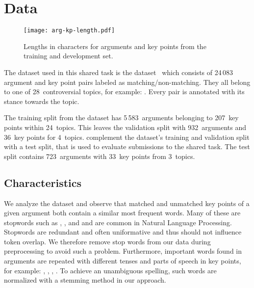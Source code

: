 \section{Data}\label{data}

\begin{figure*}
    \centering
    \texttt{[image: arg-kp-length.pdf]}
    \caption{Lengths in characters for arguments and key points from the training and development set.}
    \label{arg-kp-length}
\end{figure*}

The dataset used in this shared task is the \ArgKP dataset~\cite{Bar-HaimEFKLS2020} which consists of 24\,083 argument 
and key point pairs labeled as matching/non-matching. They all belong to one of 28~controversial topics, for example: 
. Every pair is annotated with its stance towards the topic. 

The training split from the \ArgKP dataset has 5\,583~arguments belonging to 207~key points within 24~topics. This leaves the validation split with 932~arguments and 36~key points for 4~topics.
\citet{kpa-2021-overview} complement the \ArgKP dataset's training and validation split with a test split, that is used to evaluate submissions to the shared task. The test split contains 723~arguments with 33~key points from 3~topics.

\subsection{Characteristics}

We analyze the \ArgKP dataset and observe that matched and unmatched key points of a given argument both contain a similar most frequent words. 
Many of these are stopwords such as , , and  and are common in Natural Language Processing.
Stopwords are redundant and often uniformative and thus should not influence token overlap.
We therefore remove stop words from our data during preprocessing to avoid such a problem. 
Furthermore, important words found in arguments are repeated with different tenses and parts of speech in key points, for example: 
, , , . 
To achieve an unambiguous spelling, such words are normalized with a stemming method in our approach.


